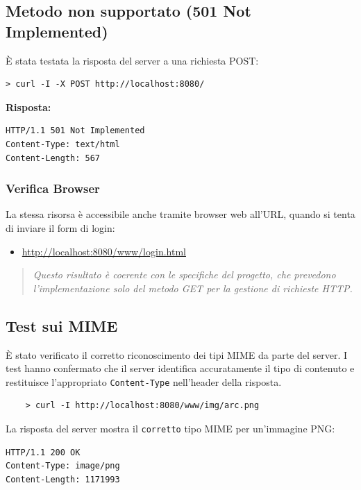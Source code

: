 \documentclass[a4paper,12pt]{report}
\begin{document}
\subsection{Metodo non supportato (501 Not Implemented)}
È stata testata la risposta del server a una richiesta POST:
\begin{verbatim}
> curl -I -X POST http://localhost:8080/
\end{verbatim}

\textbf{Risposta:}
\begin{verbatim}
HTTP/1.1 501 Not Implemented
Content-Type: text/html
Content-Length: 567
\end{verbatim}

\subsubsection{Verifica Browser}
La stessa risorsa è accessibile anche tramite browser web all'URL, quando si tenta di inviare il form di login:
\begin{itemize}
    \item \url{http://localhost:8080/www/login.html}
\end{itemize}

\vspace{0.5cm}

\begin{quote}
    \textit{Questo risultato è coerente con le specifiche del progetto, che prevedono l'implementazione solo del metodo GET per
        la gestione di richieste HTTP.}
\end{quote}

\subsection{Test sui MIME}
È stato verificato il corretto riconoscimento dei tipi MIME da parte del server. I test hanno confermato che il server
identifica accuratamente il tipo di contenuto e restituisce l'appropriato \texttt{Content-Type} nell'header della risposta.

\begin{verbatim}
    > curl -I http://localhost:8080/www/img/arc.png
\end{verbatim}

\noindent La risposta del server mostra il \texttt{corretto} tipo MIME per un'immagine PNG:
\begin{verbatim}
HTTP/1.1 200 OK
Content-Type: image/png
Content-Length: 1171993
\end{verbatim}
\end{document}
